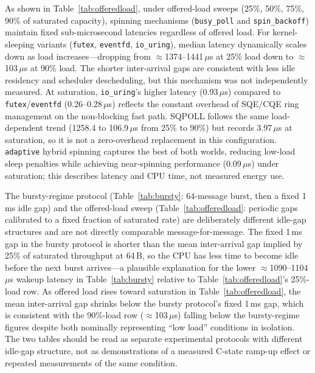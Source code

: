 \documentclass[10pt,conference]{IEEEtran}
\begin{document}
As shown in Table~\ref{tab:offeredload},
under offered-load sweeps (25\%, 50\%, 75\%, 90\% of saturated capacity), spinning mechanisms
(\mbox{\texttt{busy\_poll}} and \mbox{\texttt{spin\_backoff}}) maintain
fixed sub-microsecond latencies regardless of offered load.  For
kernel-sleeping variants
(\texttt{futex}, \texttt{eventfd}, \mbox{\texttt{io\_uring}}),
median latency dynamically scales down as load
increases---dropping from $\approx$1374--1441\,$\mu$s at 25\% load
down to $\approx$103\,$\mu$s at 90\% load.  The shorter inter-arrival gaps
are consistent with less idle residency and scheduler descheduling, but this
mechanism was not independently measured.
At saturation, \texttt{io\_uring}'s higher latency (0.93\,$\mu$s)
compared to \texttt{futex}/\texttt{eventfd} (0.26--0.28\,$\mu$s) reflects the constant overhead of
SQE/CQE ring management on the non-blocking fast path.
SQPOLL follows the same load-dependent trend (1258.4 to 106.9\,$\mu$s from
25\% to 90\%) but records 3.97\,$\mu$s at saturation, so it is not a
zero-overhead replacement in this configuration.
\texttt{adaptive} hybrid spinning captures the best of both worlds,
reducing low-load sleep penalties while achieving near-spinning
performance (0.09\,$\mu$s) under saturation; this describes latency and CPU
time, not measured energy use.

The bursty-regime protocol (Table~\ref{tab:bursty}: 64-message burst,
then a fixed 1\,ms idle gap) and the offered-load sweep
(Table~\ref{tab:offeredload}: periodic gaps calibrated to a fixed fraction of
saturated rate) are deliberately different idle-gap
structures and are not directly comparable message-for-message.  The
fixed 1\,ms gap in the bursty protocol is shorter than the mean
inter-arrival gap implied by 25\% of saturated throughput at 64\,B, so
the CPU has less time to become idle before the next
burst arrives---a plausible explanation for the lower
$\approx$1090--1104\,$\mu$s wakeup latency in Table~\ref{tab:bursty}
relative to Table~\ref{tab:offeredload}'s 25\%-load row. As offered
load rises toward saturation in Table~\ref{tab:offeredload}, the mean
inter-arrival gap shrinks below the bursty protocol's fixed 1\,ms gap,
which is consistent with the 90\%-load row ($\approx$103\,$\mu$s) falling
below the bursty-regime figures despite both nominally representing ``low
load'' conditions in isolation.  The two tables should be read as
separate experimental protocols with different idle-gap structure, not as
demonstrations of a measured C-state ramp-up effect or repeated measurements
of the same condition.
\end{document}
